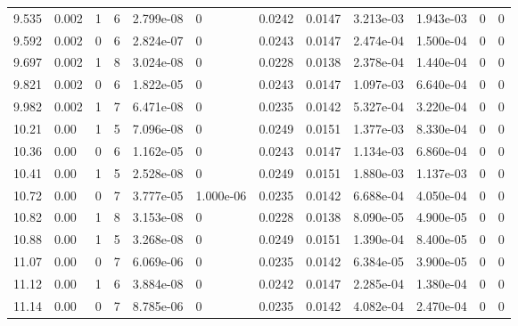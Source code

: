 \documentclass[preview]{standalone}
\begin{document}
{{\begin{tabular}{L{1.2cm}C{1.2cm} C{0.3cm}C{0.5cm} C{1.4cm}C{1.4cm} C{1.4cm}C{1.4cm} C{1.6cm}C{1.6cm} C{1.6cm}C{1.6cm}}
  9.535  &  0.002  & 1     &  6 &  2.799e-08  & 0  &  0.0242&   0.0147& 3.213e-03 & 1.943e-03   &  0 & 0  \\ 
  9.592  &  0.002  & 0     &  6 &  2.824e-07  & 0  &  0.0243&   0.0147& 2.474e-04 & 1.500e-04   &  0 & 0  \\ 
  9.697  &  0.002  & 1     &  8 &  3.024e-08  & 0  &  0.0228&   0.0138& 2.378e-04 & 1.440e-04   &  0 & 0  \\ 
  9.821  &  0.002  & 0     &  6 &  1.822e-05  & 0  &  0.0243&   0.0147& 1.097e-03 & 6.640e-04   &  0 & 0  \\ 
  9.982  &  0.002  & 1     &  7 &  6.471e-08  & 0  &  0.0235&   0.0142& 5.327e-04 & 3.220e-04   &  0 & 0  \\ 
  10.21  &  0.00  & 1     &  5 &  7.096e-08  & 0  &  0.0249&   0.0151& 1.377e-03 & 8.330e-04   &  0 & 0  \\ 
  10.36  &  0.00  & 0     &  6 &  1.162e-05  & 0  &  0.0243&   0.0147& 1.134e-03 & 6.860e-04   &  0 & 0  \\ 
  10.41  &  0.00  & 1     &  5 &  2.528e-08  & 0  &  0.0249&   0.0151& 1.880e-03 & 1.137e-03   &  0 & 0  \\ 
  10.72  &  0.00  & 0     &  7 &  3.777e-05  & 1.000e-06  &  0.0235&   0.0142& 6.688e-04 & 4.050e-04   &  0 & 0  \\ 
  10.82  &  0.00  & 1     &  8 &  3.153e-08  & 0  &  0.0228&   0.0138& 8.090e-05 & 4.900e-05   &  0 & 0  \\ 
  10.88  &  0.00  & 1     &  5 &  3.268e-08  & 0  &  0.0249&   0.0151& 1.390e-04 & 8.400e-05   &  0 & 0  \\ 
  11.07  &  0.00  & 0     &  7 &  6.069e-06  & 0  &  0.0235&   0.0142& 6.384e-05 & 3.900e-05   &  0 & 0  \\ 
  11.12  &  0.00  & 1     &  6 &  3.884e-08  & 0  &  0.0242&   0.0147& 2.285e-04 & 1.380e-04   &  0 & 0  \\ 
  11.14  &  0.00  & 0     &  7 &  8.785e-06  & 0  &  0.0235&   0.0142& 4.082e-04 & 2.470e-04   &  0 & 0  \\ 
\hline 
\end{tabular} 

}}
\end{document}
